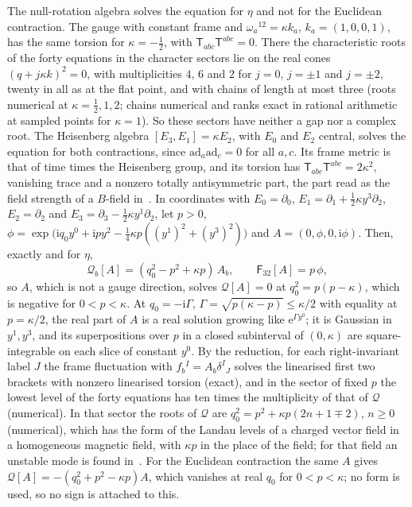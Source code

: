 The null-rotation algebra solves the equation for \(\eta\) and not for the Euclidean contraction. The gauge with constant frame and \(\omega_a{}^{12}=\kappa k_a\), \(k_a=(1,0,0,1)\), has the same torsion for \(\kappa=-\tfrac12\), with \(\mathsf T_{abc}\mathsf T^{abc}=0\). There the characteristic roots of the forty equations in the character sectors lie on the real cones \((q+j\kappa k)^2=0\), with multiplicities \(4\), \(6\) and \(2\) for \(j=0\), \(j=\pm1\) and \(j=\pm2\), twenty in all as at the flat point, and with chains of length at most three (roots numerical at \(\kappa=\tfrac12,1,2\); chains numerical and ranks exact in rational arithmetic at sampled points for \(\kappa=1\)). So these sectors have neither a gap nor a complex root. The Heisenberg algebra \([E_3,E_1]=\kappa E_2\), with \(E_0\) and \(E_2\) central, solves the equation for both contractions, since \(\mathrm{ad}_a\mathrm{ad}_c=0\) for all \(a,c\). Its frame metric is that of time times the Heisenberg group, and its torsion has \(\mathsf T_{abc}\mathsf T^{abc}=2\kappa^2\), vanishing trace and a nonzero totally antisymmetric part, the part read as the field strength of a \(B\)-field in~\cite{FurutaHanadaKawaiKimura2007}. In coordinates with \(E_0=\partial_0\), \(E_1=\partial_1+\tfrac12\kappa y^3\partial_2\), \(E_2=\partial_2\) and \(E_3=\partial_3-\tfrac12\kappa y^1\partial_2\), let \(p>0\), \(\phi=\exp\bigl(\mathrm iq_0y^0+\mathrm ipy^2-\tfrac14\kappa p((y^1)^2+(y^3)^2)\bigr)\) and \(A=(0,\phi,0,\mathrm i\phi)\). Then, exactly and for \(\eta\),
\[
\mathcal Q_b[A]=(q_0^2-p^2+\kappa p)\,A_b,\qquad\mathsf F_{32}[A]=p\,\phi,
\]
so \(A\), which is not a gauge direction, solves \(\mathcal Q[A]=0\) at \(q_0^2=p(p-\kappa)\), which is negative for \(0<p<\kappa\). At \(q_0=-\mathrm i\Gamma\), \(\Gamma=\sqrt{p(\kappa-p)}\le\kappa/2\) with equality at \(p=\kappa/2\), the real part of \(A\) is a real solution growing like \(\mathrm e^{\Gamma y^0}\); it is Gaussian in \(y^1,y^3\), and its superpositions over \(p\) in a closed subinterval of \((0,\kappa)\) are square-integrable on each slice of constant \(y^0\). By the reduction, for each right-invariant label \(J\) the frame fluctuation with \(f_b{}^I=A_b\delta^I{}_J\) solves the linearised first two brackets with nonzero linearised torsion (exact), and in the sector of fixed \(p\) the lowest level of the forty equations has ten times the multiplicity of that of \(\mathcal Q\) (numerical). In that sector the roots of \(\mathcal Q\) are \(q_0^2=p^2+\kappa p(2n+1\mp2)\), \(n\ge0\) (numerical), which has the form of the Landau levels of a charged vector field in a homogeneous magnetic field, with \(\kappa p\) in the place of the field; for that field an unstable mode is found in~\cite{NielsenOlesen1978}. For the Euclidean contraction the same \(A\) gives \(\mathcal Q[A]=-(q_0^2+p^2-\kappa p)A\), which vanishes at real \(q_0\) for \(0<p<\kappa\); no form is used, so no sign is attached to this.

